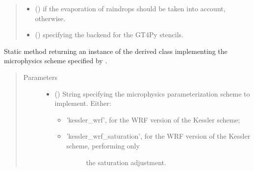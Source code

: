 \documentclass[letterpaper,10pt,english]{sphinxmanual}
\begin{document}
\begin{fulllineitems}
\begin{fulllineitems}
\begin{quote}
\begin{description}
\begin{itemize}
\item {} 
 () \textendash{}  if the evaporation of raindrops should be taken into account,  otherwise.

\item {} 
 () \textendash{}  specifying the backend for the GT4Py stencils.

\end{itemize}

\end{description}\end{quote}

\end{fulllineitems}


\begin{fulllineitems}
\label{\detokenize{api:parameterizations.adjustments.AdjustmentMicrophysics.factory}}
Static method returning an instance of the derived class implementing the microphysics scheme
specified by .
\begin{quote}\begin{description}
\item[{Parameters}] \leavevmode\begin{itemize}
\item {} 
 () \textendash{} 
String specifying the microphysics parameterization scheme to implement. Either:
\begin{itemize}
\item {} 
’kessler\_wrf’, for the WRF version of the Kessler scheme;

\item {} \begin{description}
\item[{’kessler\_wrf\_saturation’, for the WRF version of the Kessler scheme, performing only}] \leavevmode
the saturation adjustment.

\end{description}

\end{itemize}



\end{itemize}
\end{description}
\end{quote}
\end{fulllineitems}
\end{fulllineitems}
\end{document}
